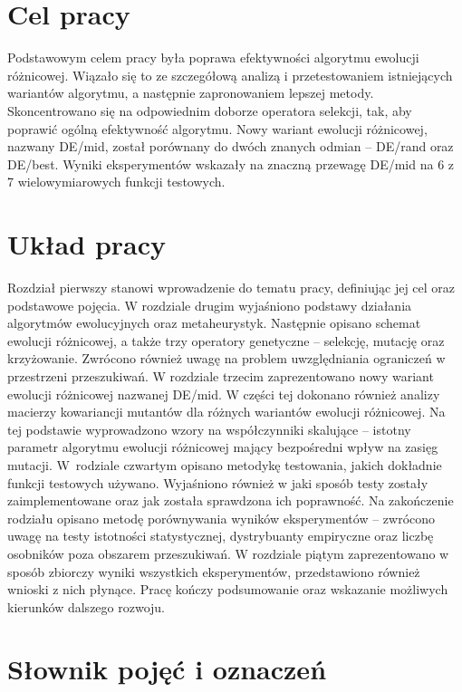 \documentclass[a4paper,onecolumn,oneside,12pt,wide,floatssmall]{mwrep}
\theoremstyle{definition}
\theoremstyle{plain}%
\theoremstyle{remark}
\begin{document}
\section{Cel pracy}

Podstawowym celem pracy była poprawa efektywności algorytmu ewolucji różnicowej.
Wiązało się to ze szczegółową analizą i przetestowaniem istniejących wariantów algorytmu,
a następnie zapronowaniem lepszej metody. 
Skoncentrowano się na odpowiednim doborze operatora selekcji, 
tak, aby poprawić ogólną efektywność algorytmu.
Nowy wariant ewolucji różnicowej, nazwany DE/mid, został porównany 
do dwóch znanych odmian -- DE/rand oraz DE/best. 
Wyniki eksperymentów wskazały na znaczną przewagę DE/mid na 6 z 7 wielowymiarowych 
funkcji testowych.

\section{Układ pracy}

Rozdział pierwszy stanowi wprowadzenie do tematu pracy, definiując jej cel oraz podstawowe pojęcia.
W rozdziale drugim wyjaśniono podstawy działania algorytmów ewolucyjnych oraz metaheurystyk. 
Następnie opisano schemat ewolucji różnicowej, a także trzy operatory genetyczne -- selekcję,
mutację oraz krzyżowanie. Zwrócono również uwagę na problem uwzględniania ograniczeń w przestrzeni
przeszukiwań.
W rozdziale trzecim zaprezentowano nowy wariant ewolucji różnicowej nazwanej DE/mid. 
W części tej dokonano również analizy macierzy kowariancji mutantów dla różnych wariantów ewolucji
różnicowej. Na tej podstawie wyprowadzono 
wzory na współczynniki skalujące -- istotny parametr algorytmu ewolucji różnicowej mający bezpośredni
wpływ na zasięg mutacji. 
W~rodziale czwartym opisano metodykę testowania, jakich dokładnie funkcji testowych 
używano.
Wyjaśniono również w jaki sposób testy zostały 
zaimplementowane oraz jak została sprawdzona ich poprawność. Na zakończenie rodziału opisano
metodę porównywania wyników eksperymentów -- zwrócono uwagę na testy istotności 
statystycznej, dystrybuanty empiryczne oraz liczbę osobników poza obszarem przeszukiwań.
W rozdziale piątym zaprezentowano w sposób zbiorczy wyniki wszystkich eksperymentów,
przedstawiono również wnioski z nich płynące. 
Pracę kończy podsumowanie oraz wskazanie możliwych kierunków dalszego rozwoju.

\section{Słownik pojęć i oznaczeń}
\end{document}
